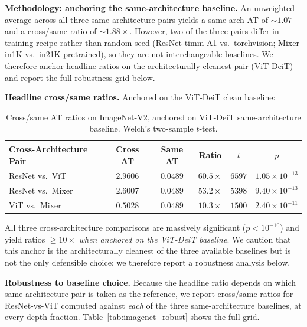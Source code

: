 \documentclass{article}
\begin{document}
\textbf{Methodology: anchoring the same-architecture baseline.} An unweighted average across all three same-architecture pairs yields a same-arch AT of $\sim 1.07$ and a cross/same ratio of $\sim 1.88\times$. However, two of the three pairs differ in training recipe rather than random seed (ResNet timm-A1 vs.\ torchvision; Mixer in1K vs.\ in21K-pretrained), so they are not interchangeable baselines. We therefore anchor headline ratios on the architecturally cleanest pair (ViT-DeiT) and report the full robustness grid below.

\textbf{Headline cross/same ratios.} Anchored on the ViT-DeiT clean baseline:

\begin{table}[t]
\caption{Cross/same AT ratios on ImageNet-V2, anchored on ViT-DeiT same-architecture baseline. Welch's two-sample $t$-test.}
\label{tab:imagenet_ratios}
\centering
\small
\begin{tabular}{@{}lccccc@{}}
\toprule
Cross-Architecture Pair & Cross AT & Same AT & Ratio & $t$ & $p$ \\
\midrule
ResNet vs.\ ViT     & $2.9606$ & $0.0489$ & $\mathbf{60.5\times}$ & $6597$ & $1.05 \times 10^{-13}$ \\
ResNet vs.\ Mixer   & $2.6007$ & $0.0489$ & $\mathbf{53.2\times}$ & $5398$ & $9.40 \times 10^{-13}$ \\
ViT vs.\ Mixer      & $0.5028$ & $0.0489$ & $\mathbf{10.3\times}$ & $1500$ & $2.40 \times 10^{-11}$ \\
\bottomrule
\end{tabular}
\end{table}

All three cross-architecture comparisons are massively significant ($p < 10^{-10}$) and yield ratios $\geq 10\times$ \emph{when anchored on the ViT-DeiT baseline}. We caution that this anchor is the architecturally cleanest of the three available baselines but is not the only defensible choice; we therefore report a robustness analysis below.

\textbf{Robustness to baseline choice.} Because the headline ratio depends on which same-architecture pair is taken as the reference, we report cross/same ratios for ResNet-vs-ViT computed against \emph{each} of the three same-architecture baselines, at every depth fraction. Table~\ref{tab:imagenet_robust} shows the full grid.
\end{document}
